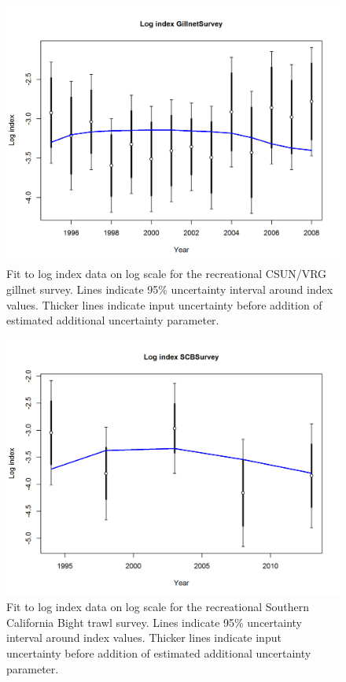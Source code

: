 \documentclass[12pt,]{article}
\begin{document}
\FloatBarrier

\begin{figure}[htbp]
\centering
\includegraphics{r4ss/plots_mod1/index5_logcpuefit_GillnetSurvey.png}
\caption{Fit to log index data on log scale for the recreational
CSUN/VRG gillnet survey. Lines indicate 95\% uncertainty interval around
index values. Thicker lines indicate input uncertainty before addition
of estimated additional uncertainty parameter.
\label{fig:index5_logcpuefit_GillnetSurvey}}
\end{figure}

\FloatBarrier

\begin{figure}[htbp]
\centering
\includegraphics{r4ss/plots_mod1/index5_logcpuefit_SCBSurvey.png}
\caption{Fit to log index data on log scale for the recreational
Southern California Bight trawl survey. Lines indicate 95\% uncertainty
interval around index values. Thicker lines indicate input uncertainty
before addition of estimated additional uncertainty parameter.
\label{fig:index5_logcpuefit_SCBSurvey}}
\end{figure}
\end{document}
